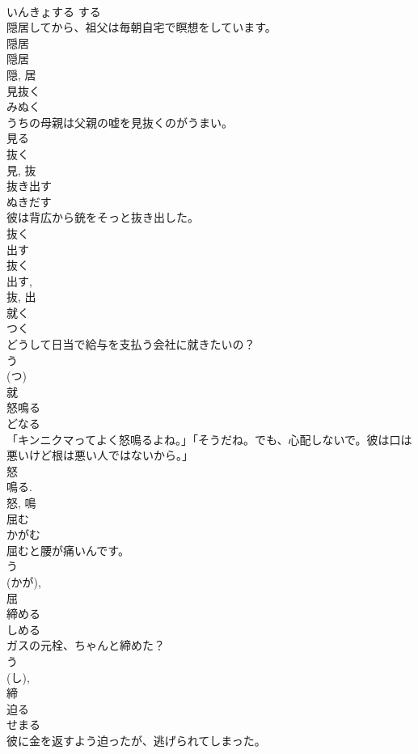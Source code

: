 \documentclass[8pt]{extreport}
\begin{document}
\begin{CJK}{UTF8}{min}
\\	いんきょする	する 
\\	隠居してから、祖父は毎朝自宅で瞑想をしています。	
\\	隠居 
\\	隠居 
\\	隠, 居	
\\	見抜く	
\\	みぬく	
\\	うちの母親は父親の嘘を見抜くのがうまい。	
\\	見る 
\\	抜く 
\\	見, 抜	
\\	抜き出す	
\\	ぬきだす	
\\	彼は背広から銃をそっと抜き出した。	
\\	抜く 
\\	出す 
\\	抜く 
\\	出す, 
\\	抜, 出	
\\	就く	
\\	つく	
\\	どうして日当で給与を支払う会社に就きたいの？	
\\	う 
\\	(つ) 
\\	就	
\\	怒鳴る	
\\	どなる	
\\	「キンニクマってよく怒鳴るよね。」「そうだね。でも、心配しないで。彼は口は悪いけど根は悪い人ではないから。」	
\\	怒 
\\	鳴る. 
\\	怒, 鳴	
\\	屈む	
\\	かがむ	
\\	屈むと腰が痛いんです。	
\\	う 
\\	(かが), 
\\	屈	
\\	締める	
\\	しめる	
\\	ガスの元栓、ちゃんと締めた？	
\\	う 
\\	(し), 
\\	締	
\\	迫る	
\\	せまる	
\\	彼に金を返すよう迫ったが、逃げられてしまった。	

\end{CJK}
\end{document}
